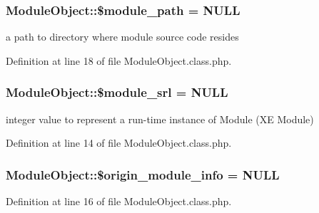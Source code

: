 \hypertarget{classModuleObject_aba24677d5cf457dc33d9af3d8a3b3a14}{}
\subsubsection[{\$module\+\_\+path}]{\setlength{\rightskip}{0pt plus 5cm}Module\+Object\+::\$module\+\_\+path = N\+U\+L\+L}\label{classModuleObject_aba24677d5cf457dc33d9af3d8a3b3a14}


a path to directory where module source code resides 



Definition at line 18 of file Module\+Object.\+class.\+php.

\hypertarget{classModuleObject_a0da50016ddc31513f563206fdf6f413d}{}
\subsubsection[{\$module\+\_\+srl}]{\setlength{\rightskip}{0pt plus 5cm}Module\+Object\+::\$module\+\_\+srl = N\+U\+L\+L}\label{classModuleObject_a0da50016ddc31513f563206fdf6f413d}


integer value to represent a run-\/time instance of Module (X\+E Module) 



Definition at line 14 of file Module\+Object.\+class.\+php.

\hypertarget{classModuleObject_a6bdf7982a5defc9d618c2dd1b700e876}{}
\subsubsection[{\$origin\+\_\+module\+\_\+info}]{\setlength{\rightskip}{0pt plus 5cm}Module\+Object\+::\$origin\+\_\+module\+\_\+info = N\+U\+L\+L}\label{classModuleObject_a6bdf7982a5defc9d618c2dd1b700e876}


Definition at line 16 of file Module\+Object.\+class.\+php.

\hypertarget{classModuleObject_ad4efa1b4c623247763e4d56f76c5fb1c}{}
